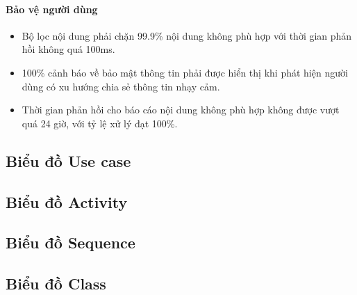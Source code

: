 \paragraph{Bảo vệ người dùng}
\begin{itemize}
    \item Bộ lọc nội dung phải chặn 99.9\% nội dung không phù hợp với thời gian phản hồi không quá 100ms. 
    \item 100\% cảnh báo về bảo mật thông tin phải được hiển thị khi phát hiện người dùng có xu hướng chia sẻ thông tin nhạy cảm. 
    \item Thời gian phản hồi cho báo cáo nội dung không phù hợp không được vượt quá 24 giờ, với tỷ lệ xử lý đạt 100\%.
\end{itemize}

\subsection{Biểu đồ Use case}

\subsection{Biểu đồ Activity}

\subsection{Biểu đồ Sequence}


\subsection{Biểu đồ Class}

